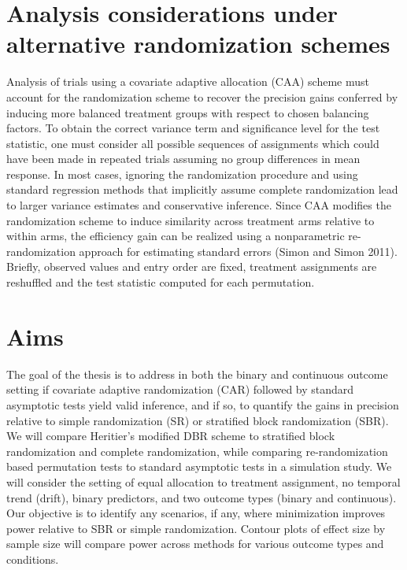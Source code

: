\section{Analysis considerations under alternative randomization schemes}
Analysis of trials using a covariate adaptive allocation (CAA) scheme must account for the randomization scheme to recover the precision gains conferred by inducing more balanced treatment groups with respect to chosen balancing factors.  
To obtain the correct variance term and significance level for the test statistic, one must consider all possible sequences of assignments which could have been made in repeated trials assuming no group differences in mean response.  
In most cases, ignoring the randomization procedure and using standard regression methods that implicitly assume complete randomization lead to larger variance estimates and conservative inference. 
Since CAA modifies the randomization scheme to induce similarity across treatment arms relative to within arms, the efficiency gain can be realized using a nonparametric re-randomization approach for estimating standard errors (Simon and Simon 2011).  
Briefly, observed values and entry order are fixed, treatment assignments are reshuffled and the test statistic computed for each permutation.  

\section{Aims}
The goal of the thesis is to address in both the binary and continuous outcome setting if covariate adaptive randomization (CAR) followed by standard asymptotic tests yield valid inference, and if so, to quantify the gains in precision relative to simple randomization (SR) or stratified block randomization (SBR).  
We will compare Heritier’s modified DBR scheme to stratified block randomization and complete randomization, while comparing re-randomization based permutation tests to standard asymptotic tests in a simulation study.  
We will consider the setting of equal allocation to treatment assignment, no temporal trend (drift), binary predictors, and two outcome types (binary and continuous).  
Our objective is to identify any scenarios, if any, where minimization improves power relative to SBR or simple randomization. 
Contour plots of effect size by sample size will compare power across methods for various outcome types and conditions. 

